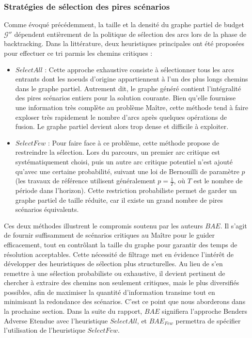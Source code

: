 \documentclass[12pt, a4paper, twoside]{report}
\numberwithin{equation}{section}
\begin{document}
	\subsubsection{Stratégies de sélection des pires scénarios}
	
	Comme évoqué précédemment, la taille et la densité du graphe partiel de budget $\mathcal{G}''$ dépendent entièrement de la politique de sélection des arcs lors de la phase de backtracking. Dans la littérature, deux heuristiques principales ont été proposées pour effectuer ce tri parmis les chemins critiques \cite{portoleau:tel-04631599} :
	
	\begin{itemize}
		\item $SelectAll$ : Cette approche exhaustive consiste à sélectionner tous les arcs entrants dont les noeuds d'origine appartiennent à l'un des plus longs chemins dans le graphe partiel. Autrement dit, le graphe généré contient l'intégralité des pires scénarios entiers pour la solution courante. Bien qu'elle fournisse une information très complète au problème Maître, cette méthode tend à faire exploser très rapidement le nombre d'arcs après quelques opérations de fusion. Le graphe partiel devient alors trop dense et difficile à exploiter.
		\item $SelectFew$ : Pour faire face à ce problème, cette méthode propose de restreindre la sélection. Lors du parcours, un premier arc critique est systématiquement choisi, puis un autre arc critique potentiel n'est ajouté qu'avec une certaine probabilité, suivant une loi de Bernouilli de paramètre $p$ (les travaux de référence utilisent généralement $p=\frac{1}{T}$, où $T$ est le nombre de période dans l'horizon). Cette restriction probabiliste permet de garder un graphe partiel de taille réduite, car il existe un grand nombre de pires scénarios équivalents.
	\end{itemize}
	
	Ces deux méthodes illustrent le compromis soutenu par les auteurs $BAE$. Il s'agit de fournir suffisamment de scénarios critiques au Maître pour le guider efficacement, tout en contrôlant la taille du graphe pour garantir des temps de résolution acceptables. Cette nécessité de filtrage met en évidence l'intérêt de développer des heuristiques de sélection plus structurelles. Au lieu de s'en remettre à une sélection probabiliste ou exhaustive, il devient pertinent de chercher à extraire des chemins non seulement critiques, mais le plus diversifiés possibles, afin de maximiser la quantité d'information transime tout en minimisant la redondance des scénarios. C'est ce point que nous aborderons dans la prochaine section. Dans la suite du rapport, $BAE$ signifiera l'approche Benders Adverse Etendue avec l'heuristique $SelectAll$, et $BAE_{Few}$ permettra de spécifier l'utilisation de l'heuristique $SelectFew$.
	
\end{document}
